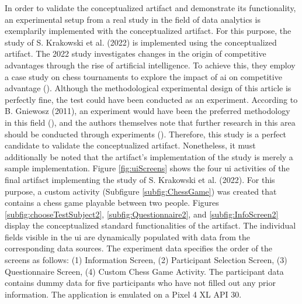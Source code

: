 In order to validate the conceptualized artifact and demonstrate its functionality, an experimental setup from a real study in the field of data analytics is exemplarily implemented with the conceptualized artifact. For this purpose, the study of S. Krakowski et al. (2022) is implemented using the conceptualized artifact. The 2022 study investigates changes in the origin of competitive advantages through the rise of artificial intelligence. To achieve this, they employ a case study on chess tournaments to explore the impact of \ac{ai} on competitive advantage (\cite{Krakowski.2022}). Although the methodological experimental design of this article is perfectly fine, the test could have been conducted as an experiment. According to B. Gniewosz (2011), an experiment would have been the preferred methodology in this field (\cite{Gniewosz.2011}), and the authors themselves note that further research in this area should be conducted through experiments (\cite{Krakowski.2022}). Therefore, this study is a perfect candidate to validate the conceptualized artifact. Nonetheless, it must additionally be noted that the artifact's implementation of the study is merely a sample implementation. Figure \ref{fig:uiScreens} shows the four \ac{ui} activities of the final artifact implementing the study of S. Krakowski et al. (2022). For this purpose, a custom activity (Subfigure \ref{subfig:ChessGame}) was created that contains a chess game playable between two people. Figures \ref{subfig:chooseTestSubject2}, \ref{subfig:Questionnaire2}, and \ref{subfig:InfoScreen2} display the conceptualized standard functionalities of the artifact. The individual fields visible in the \ac{ui} are dynamically populated with data from the corresponding data sources. The experiment data specifies the order of the screens as follows: (1) Information Screen, (2) Participant Selection Screen, (3) Questionnaire Screen, (4) Custom Chess Game Activity. The participant data contains dummy data for five participants who have not filled out any prior information. The application is emulated on a Pixel 4 XL API 30.



